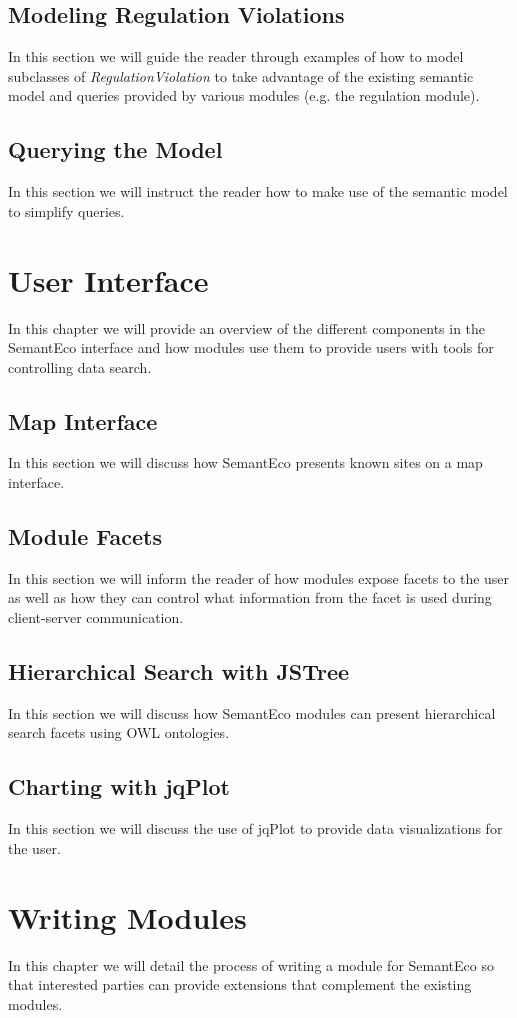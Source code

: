 \documentclass[letterpaper]{report}
\begin{document}
\section{Modeling Regulation Violations}
\label{regulation-violation}
In this section we will guide the reader through examples of how to model subclasses of \textit{RegulationViolation} to take advantage of the existing semantic model and queries provided by various modules (e.g. the regulation module).
\section{Querying the Model}
\label{querying}
In this section we will instruct the reader how to make use of the semantic model to simplify queries.
\chapter{User Interface}
\label{user-interface}
In this chapter we will provide an overview of the different components in the SemantEco interface and how modules use them to provide users with tools for controlling data search.
\section{Map Interface}
\label{maps}
In this section we will discuss how SemantEco presents known sites on a map interface.
\section{Module Facets}
\label{facets}
In this section we will inform the reader of how modules expose facets to the user as well as how they can control what information from the facet is used during client-server communication.
\section{Hierarchical Search with JSTree}
\label{hierarchical-search}
In this section we will discuss how SemantEco modules can present hierarchical search facets using OWL ontologies.
\section{Charting with jqPlot}
\label{visualization}
In this section we will discuss the use of jqPlot to provide data visualizations for the user.
\chapter{Writing Modules}
\label{writing-modules}
In this chapter we will detail the process of writing a module for SemantEco so that interested parties can provide extensions that complement the existing modules.
\end{document}
